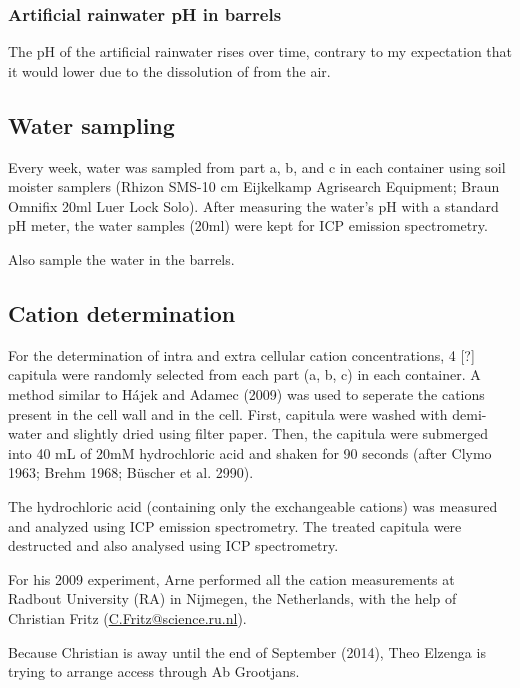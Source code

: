 \documentclass[12pt,a4paper,draft]{article}\usepackage[]{graphicx}\usepackage[]{color}
\begin{document}
\subsubsection{Artificial rainwater pH in barrels}

The pH of the artificial rainwater rises over time, contrary to my expectation that it would lower due to the dissolution of  from the air.

\subsection{Water sampling}

Every week, water was sampled from part a, b, and c in each container using soil moister samplers (Rhizon SMS-10 cm Eijkelkamp Agrisearch Equipment; Braun Omnifix 20ml Luer Lock Solo). After measuring the water's pH with a standard pH meter, the water samples (20ml) were kept for ICP emission spectrometry.

Also sample the water in the barrels.

\subsection{Cation determination}

For the determination of intra and extra cellular cation concentrations, 4 [?] capitula were randomly selected from each part (a, b, c) in each container. 
A method similar to Hájek and Adamec (2009) was used to seperate the cations present in the cell wall and in the cell. First, capitula were washed with demi-water and slightly dried using filter paper. Then, the capitula were submerged into 40 mL of 20mM hydrochloric acid and shaken for 90 seconds (after Clymo 1963; Brehm 1968; Büscher et al. 2990).

The hydrochloric acid (containing only the exchangeable cations) was measured and analyzed using ICP emission spectrometry. The treated capitula were destructed and also analysed using ICP spectrometry.

For his 2009 experiment, Arne performed all the cation measurements at Radbout University (RA) in Nijmegen, the Netherlands, with the help of Christian Fritz (\href{mailto:C.Fritz@science.ru.nl}{C.Fritz@science.ru.nl}).

Because Christian is away until the end of September (2014), Theo Elzenga is trying to arrange access through Ab Grootjans.
\end{document}
